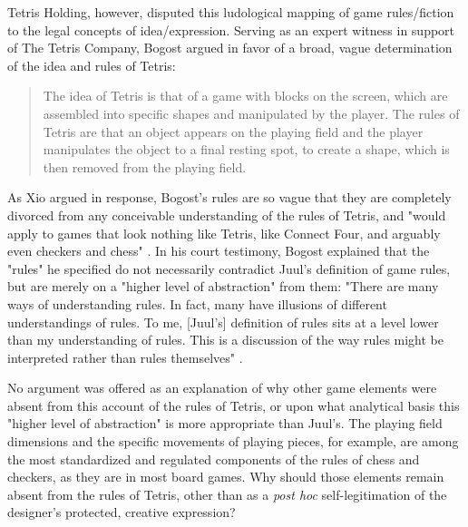 Tetris Holding, however, disputed this ludological mapping of game rules/fiction to the legal concepts of idea/expression. Serving as an expert witness in support of The Tetris Company, Bogost argued in favor of a broad, vague determination of the idea and rules of Tetris:
\blockquote{
  The idea of Tetris is that of a game with blocks on the screen, which are assembled into specific shapes and manipulated by the player. The rules of Tetris are that an object appears on the playing field and the player manipulates the object to a final resting spot, to create a shape, which is then removed from the playing field. \autocite*[5--6]{bogost-tetris}
}
As Xio argued in response, Bogost's rules are so vague that they are completely divorced from any conceivable understanding of the rules of Tetris, and "would apply to games that look nothing like Tetris, like Connect Four, and arguably even checkers and chess" \autocite[31]{xio-summary}. In his court testimony, Bogost explained that the "rules" he specified do not necessarily contradict Juul's definition of game rules, but are merely on a "higher level of abstraction" from them: "There are many ways of understanding rules. In fact, many have illusions of different understandings of rules. To me, [Juul's] definition of rules sits at a level lower than my understanding of rules. This is a discussion of the way rules might be interpreted rather than rules themselves" \autocite[172.17--19]{Bogost-deposition}.

No argument was offered as an explanation of why other game elements were absent from this account of the rules of Tetris, or upon what analytical basis this "higher level of abstraction" is more appropriate than Juul's. The playing field dimensions and the specific movements of playing pieces, for example, are among the most standardized and regulated components of the rules of chess and checkers, as they are in most board games. Why should those elements remain absent from the rules of Tetris, other than as a \emph{post hoc} self-legitimation of the designer's protected, creative expression?

